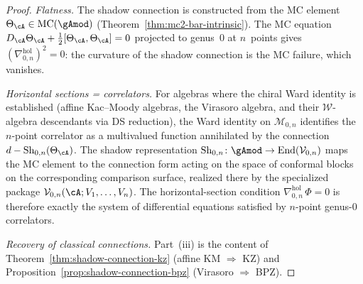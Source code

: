 \begin{proof}
\emph{Flatness.}\;
The shadow connection is constructed from the MC element
$\Theta_\cA \in \mathrm{MC}(\gAmod)$
(Theorem~\ref{thm:mc2-bar-intrinsic}). The MC equation
$D_\cA\Theta_\cA + \tfrac{1}{2}[\Theta_\cA,\Theta_\cA]=0$
projected to genus~$0$ at $n$~points gives
$(\nabla^{\mathrm{hol}}_{0,n})^2 = 0$: the curvature of the shadow
connection is the MC failure, which vanishes.

\smallskip\noindent
\emph{Horizontal sections = correlators.}\;
For algebras where the chiral Ward identity is established (affine
Kac--Moody algebras, the Virasoro algebra, and their $\mathcal{W}$-algebra
descendants via DS reduction), the Ward identity on $\mathcal{M}_{0,n}$
identifies the $n$-point correlator as a multivalued function annihilated
by the connection $d - \operatorname{Sh}_{0,n}(\Theta_\cA)$.
The shadow representation
$\operatorname{Sh}_{0,n}\colon \gAmod \to
\operatorname{End}(\mathcal{V}_{0,n})$
maps the MC element to the connection form acting on the space
of conformal blocks on the corresponding comparison surface,
realized there by the specialized package
$\mathcal{V}_{0,n}(\cA;V_1,\dotsc,V_n)$.
The horizontal-section condition
$\nabla^{\mathrm{hol}}_{0,n}\,\Phi = 0$
is therefore exactly the system of differential equations satisfied
by $n$-point genus-$0$ correlators.

\emph{Recovery of classical connections.}\;
Part~(iii) is the content of
Theorem~\ref{thm:shadow-connection-kz} (affine KM $\Rightarrow$ KZ)
and
Proposition~\ref{prop:shadow-connection-bpz}
(Virasoro $\Rightarrow$ BPZ).
\end{proof}

